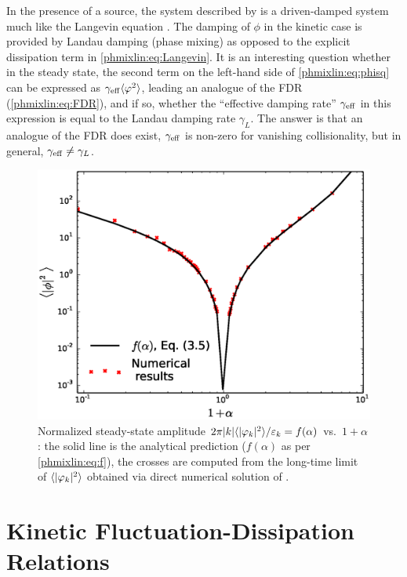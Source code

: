 In the presence of a source, the system described by  
is a driven-damped system much like the Langevin equation . 
The damping of $\phi$ in the kinetic case is provided by Landau damping 
(phase mixing) as opposed to the explicit dissipation term in \eqref{phmixlin:eq:Langevin}. 
It is an interesting question whether 
in the steady state, the second term on the left-hand side 
of \eqref{phmixlin:eq:phisq} can be expressed as $\gamma_{\rm eff}\langle\varphi^2\rangle$, leading 
an analogue of the FDR (\eqref{phmixlin:eq:FDR}), and if so, whether the 
``effective damping rate'' $\gamma_{\rm eff}$ in this expression is equal 
to the Landau damping rate $\gamma_L$. 
The answer is that an analogue of the FDR does exist, 
$\gamma_{\rm eff}$ is non-zero for vanishing collisionality, but in general, $\gamma_{\rm eff}\neq\gamma_L$. 

\begin{figure}
\begin{center}
\includegraphics[width=14.8cm]{figs/phmixlin/phi2.eps}
\caption{Normalized steady-state amplitude $2\pi|k|\langle|\varphi_k|^2\rangle/\varepsilon_k=f(\alpha)$ 
vs.\ $1+\alpha$: the solid line is the analytical prediction 
($f(\alpha)$ as per \eqref{phmixlin:eq:f}), the crosses are computed from 
the long-time limit of $\langle|\varphi_k|^2\rangle$ obtained via direct numerical 
solution of .}
\label{phmixlin:fig:f}
\end{center}
\end{figure}


\section{Kinetic Fluctuation-Dissipation Relations}
\label{phmixlin:sec:FDR}

